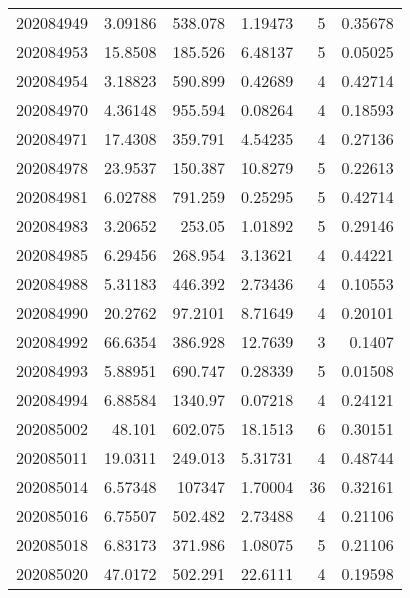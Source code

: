 \begin{tabular}{rrrrrr}
 202084949 &          3.09186 &      538.078  &            1.19473 &           5 & 0.35678 \\
 202084953 &         15.8508  &      185.526  &            6.48137 &           5 & 0.05025 \\
 202084954 &          3.18823 &      590.899  &            0.42689 &           4 & 0.42714 \\
 202084970 &          4.36148 &      955.594  &            0.08264 &           4 & 0.18593 \\
 202084971 &         17.4308  &      359.791  &            4.54235 &           4 & 0.27136 \\
 202084978 &         23.9537  &      150.387  &           10.8279  &           5 & 0.22613 \\
 202084981 &          6.02788 &      791.259  &            0.25295 &           5 & 0.42714 \\
 202084983 &          3.20652 &      253.05   &            1.01892 &           5 & 0.29146 \\
 202084985 &          6.29456 &      268.954  &            3.13621 &           4 & 0.44221 \\
 202084988 &          5.31183 &      446.392  &            2.73436 &           4 & 0.10553 \\
 202084990 &         20.2762  &       97.2101 &            8.71649 &           4 & 0.20101 \\
 202084992 &         66.6354  &      386.928  &           12.7639  &           3 & 0.1407  \\
 202084993 &          5.88951 &      690.747  &            0.28339 &           5 & 0.01508 \\
 202084994 &          6.88584 &     1340.97   &            0.07218 &           4 & 0.24121 \\
 202085002 &         48.101   &      602.075  &           18.1513  &           6 & 0.30151 \\
 202085011 &         19.0311  &      249.013  &            5.31731 &           4 & 0.48744 \\
 202085014 &          6.57348 &   107347      &            1.70004 &          36 & 0.32161 \\
 202085016 &          6.75507 &      502.482  &            2.73488 &           4 & 0.21106 \\
 202085018 &          6.83173 &      371.986  &            1.08075 &           5 & 0.21106 \\
 202085020 &         47.0172  &      502.291  &           22.6111  &           4 & 0.19598 \\

\end{tabular}
